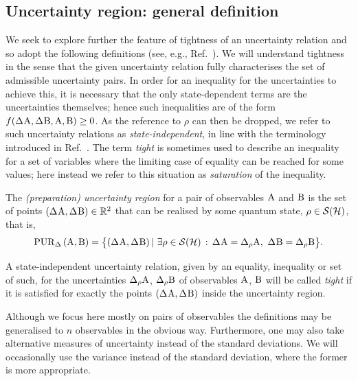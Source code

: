 \subsection{Uncertainty region: general definition}\label{sec:pur-def}
We seek to explore further the feature of tightness of an uncertainty relation  and so adopt the following definitions (see, e.g., Ref.~\cite{AbbottAlzieuHallBranciard2016}).
We will understand tightness in the sense that the given uncertainty relation fully characterises the set of admissible uncertainty pairs. In order for an inequality for the uncertainties to achieve this, it is necessary that the only state-dependent terms are the uncertainties themselves; hence such inequalities are of the form $f(\sdev{\opa},\sdev{\opb}, \opa,\opb)\ge 0$. As the reference to $\rho$ can then be dropped, we refer to such uncertainty relations as {\em state-independent}, in line with the terminology introduced in  Ref.~\cite{AbbottAlzieuHallBranciard2016}.
The term {\em tight} is sometimes used to describe an inequality for a set of variables where the limiting case of equality can be reached for some values; here instead we refer to this situation as {\em saturation} of the inequality. 

\begin{dfn}
  The {\em (preparation) uncertainty region} for a pair of observables $\operatorname{A}$ and $\operatorname{B}$ is the set of points $(\sdev{\opa}, \sdev{\opb})\in \mathbb{R}^2$  that can be realised by some quantum state, $\rho\in\mathcal{S}(\mathcal{H})$, that is,
  \begin{equation}%
   \PUR{\Delta}{\opa}{\opb} = \bigl\{(\sdev{\opa},\sdev{\opb})\,|\,\,\exists\rho\in\si(\hi)\,:\,\sdev{\opa}=\sdevr{\opa},\ \sdev{\opb}=\sdevr{\opb}\bigr\}. %
  \end{equation}
\end{dfn}
\begin{dfn}\label{def:tight}
  A state-independent uncertainty relation, given by an equality, inequality or set of such, for the uncertainties $\sdevr{\opa}$, $\sdevr{\opb}$ of observables $\operatorname{A}$, $\operatorname{B}$ will be called {\em tight} if it is satisfied for exactly the points $(\sdev{\opa}, \sdev{\opb})$ inside the uncertainty region.
\end{dfn}
Although we focus here mostly on pairs of observables the definitions may be generalised to $n$ observables in the obvious way. Furthermore, one may also take alternative measures of uncertainty instead of the standard deviations. We will occasionally use the variance instead of the standard deviation, where the former is more appropriate.

